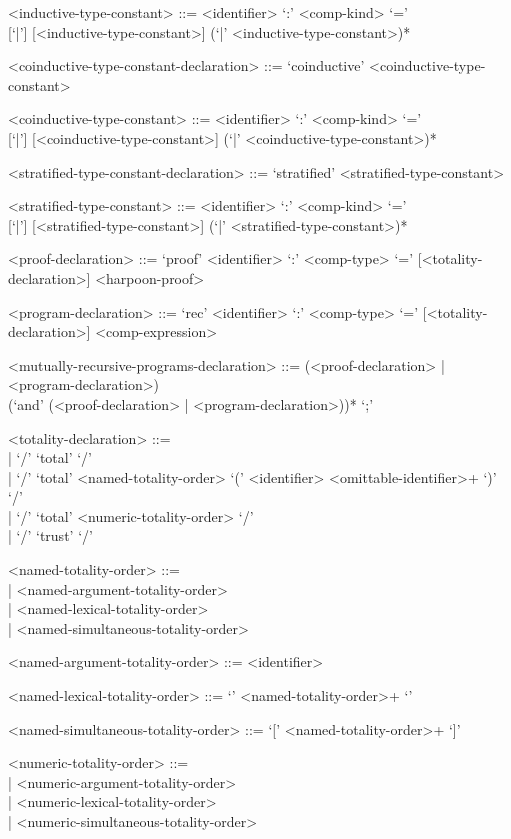 \documentclass[11pt]{article}
\begin{document}
\begin{grammar}
<inductive-type-constant> ::= <identifier> `:' <comp-kind> `='\\{}
 [`|'] [<inductive-type-constant>] (`|' <inductive-type-constant>)*

<coinductive-type-constant-declaration> ::= `coinductive' <coinductive-type-constant>

<coinductive-type-constant> ::= <identifier> `:' <comp-kind> `='\\{}
 [`|'] [<coinductive-type-constant>] (`|' <coinductive-type-constant>)*

<stratified-type-constant-declaration> ::= `stratified' <stratified-type-constant>

<stratified-type-constant> ::= <identifier> `:' <comp-kind> `='\\{}
 [`|'] [<stratified-type-constant>] (`|' <stratified-type-constant>)*

<proof-declaration> ::= `proof' <identifier> `:' <comp-type> `=' [<totality-declaration>] <harpoon-proof>

<program-declaration> ::= `rec' <identifier> `:' <comp-type> `=' [<totality-declaration>] <comp-expression>

<mutually-recursive-programs-declaration> ::= (<proof-declaration> | <program-declaration>) \\
(`and' (<proof-declaration> | <program-declaration>))* `;'

<totality-declaration> ::= \hfill\\
| `/' `total' `/'\\
| `/' `total' <named-totality-order> `(' <identifier> <omittable-identifier>+ `)' `/'\\
| `/' `total' <numeric-totality-order> `/'\\
| `/' `trust' `/'

<named-totality-order> ::= \hfill\\
| <named-argument-totality-order>\\
| <named-lexical-totality-order>\\
| <named-simultaneous-totality-order>

<named-argument-totality-order> ::= <identifier>

<named-lexical-totality-order> ::= `{' <named-totality-order>+ `}'

<named-simultaneous-totality-order> ::= `[' <named-totality-order>+ `]'

<numeric-totality-order> ::= \hfill\\
| <numeric-argument-totality-order>\\
| <numeric-lexical-totality-order>\\
| <numeric-simultaneous-totality-order>


\end{grammar}
\end{document}
